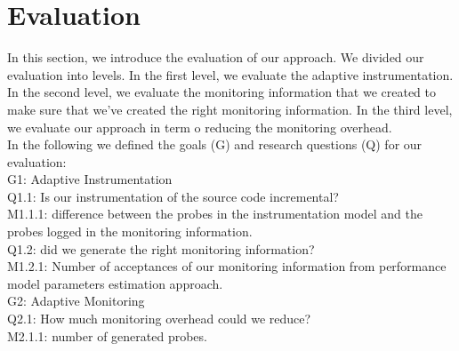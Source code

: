 
\chapter{Evaluation}
\label{ch:Evaluation}

In this section, we introduce the evaluation of our approach. We divided our evaluation into levels. In the first level, we evaluate the adaptive instrumentation. In the second level, we evaluate the monitoring information that we created to make sure that we’ve created the right monitoring information. In the third level, we evaluate our approach in term o reducing the monitoring overhead. \\
In the following we defined the goals (G) and research questions (Q) for our evaluation:\\

G1: Adaptive Instrumentation\\
  \quad Q1.1: Is our instrumentation of the source code incremental?\\
	  \qquad M1.1.1: difference between the probes in the instrumentation model and the probes logged in the        
	                monitoring information. \\
  \quad Q1.2: did we generate the right monitoring information?\\
	    \qquad M1.2.1: Number of acceptances of our monitoring information from performance model parameters  
	                         estimation approach.\\
G2: Adaptive Monitoring\\
   \hspace{10mm} Q2.1: How much monitoring overhead could we reduce?\\
        \hspace{20mm} M2.1.1: number of generated probes.\\


